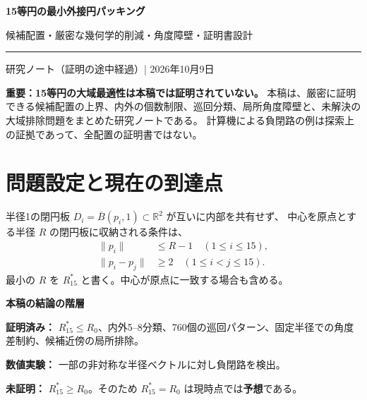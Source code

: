 \documentclass[11pt,a4paper]{article}
\theoremstyle{JPthm}
\theoremstyle{definition}
\newcommand{\Rstar}{R_{15}^{*}}
\newcommand{\Rc}{R_{0}}
\begin{document}
\begin{center}
{\sffamily\color{ink}\LARGE\bfseries 15等円の最小外接円パッキング}\par
\vspace{3mm}
{\sffamily\large 候補配置・厳密な幾何学的削減・角度障壁・証明書設計}\par
\vspace{3mm}
{\color{sea}\rule{.76\linewidth}{1pt}}\par
\vspace{2mm}
{\small 研究ノート（証明の途中経過）\quad | \quad 2026年10月9日}
\end{center}
\vspace{3mm}
\begin{warningbox}
\textbf{重要：15等円の大域最適性は本稿では証明されていない。}\quad
本稿は、厳密に証明できる候補配置の上界、内外の個数制限、巡回分類、局所角度障壁と、未解決の大域排除問題をまとめた研究ノートである。
計算機による負閉路の例は探索上の証拠であって、全配置の証明書ではない。
\end{warningbox}
\begin{abstract}
半径1の合同な円15個を、重なりなく収容する最小の円形容器の半径を $\Rstar$ とする。
既知の $D_5$ 対称候補から、
$\Rc=1+\sqrt{1+(2+\cot(\pi/5))^2}=4.5213569647\ldots$
という厳密な上界を得る。
中心距離 $s$ のしきい値 $L=(\Rc-1)-4/(\Rc-1)$ により、
任意の候補配置では内側の中心数が5--8、外側が7--10であることを示す。
合同円の交換対称性を利用すると、内外の巡回パターンは二面体群同値で760種類となる。
さらに候補配置近傍の $(I,O,O)^5$ 型を、5変数の角度障壁で排除する。
全760クラスにおける連続的な中心距離の大域排除は残された課題である。
\end{abstract}
\tableofcontents
\clearpage

\section{問題設定と現在の到達点}
半径1の閉円板 $D_i=\overline B(p_i,1)\subset\mathbb R^2$ が互いに内部を共有せず、
中心を原点とする半径 $R$ の閉円板に収納される条件は、
\begin{align}
\lVert p_i\rVert &\le R-1 \quad (1\le i\le15),\label{eq:wall}\\
\lVert p_i-p_j\rVert&\ge2\quad(1\le i<j\le15).\label{eq:pair}
\end{align}
最小の $R$ を $\Rstar$ と書く。中心が原点に一致する場合も含める。

\begin{statusbox}
\textbf{本稿の結論の階層}\par
\textcolor{mint}{\textbf{証明済み：}} $\Rstar\le\Rc$、内外5--8分類、760個の巡回パターン、固定半径での角度差制約、候補近傍の局所排除。\par
\textcolor{amber}{\textbf{数値実験：}} 一部の非対称な半径ベクトルに対し負閉路を検出。\par
\textcolor{alert}{\textbf{未証明：}} $\Rstar\ge\Rc$。そのため $\Rstar=\Rc$ は現時点では\textbf{予想}である。
\end{statusbox}
\end{document}
